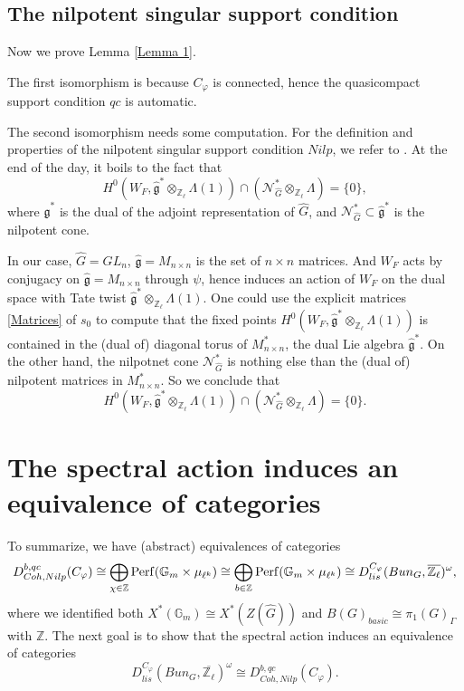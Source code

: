 \subsection{The nilpotent singular support condition}
Now we prove Lemma \ref{Lemma 1}. 

The first isomorphism is because $C_{\varphi}$ is connected, hence the quasicompact support condition $qc$ is automatic. 

The second isomorphism needs some computation. For the definition and properties of the nilpotent singular support condition $Nilp$, we refer to \cite[Section VIII.2]{fargues2021geometrization}. At the end of the day, it boils to the fact that
$$H^0(W_F, \hat{\mathfrak{g}}^*\otimes_{\mathbb{Z}_{\ell}}\Lambda(1)) \cap \left(\mathcal{N}_{\hat{G}}^*\otimes _{\mathbb{Z}_{\ell}}\Lambda\right)=\{0\},$$
where $\hat{\mathfrak{g}}^*$ is the dual of the adjoint representation of $\hat{G}$, and $\mathcal{N}_{\hat{G}}^* \subset \hat{\mathfrak{g}}^*$ is the nilpotent cone.

In our case, $\hat{G}=GL_n$, $\hat{\mathfrak{g}}=M_{n\times n}$ is the set of $n \times n$ matrices. And $W_F$ acts by conjugacy on $\hat{\mathfrak{g}}=M_{n\times n}$ through $\psi$, hence induces an action of $W_F$ on the dual space with Tate twist $\hat{\mathfrak{g}}^*\otimes_{\mathbb{Z}_{\ell}}\Lambda(1)$. One could use the explicit matrices \ref{Matrices} of $s_0$ to compute that the fixed points $H^0(W_F, \hat{\mathfrak{g}}^*\otimes_{\mathbb{Z}_{\ell}}\Lambda(1))$ is contained in the (dual of) diagonal torus of $M_{n\times n}^*$, the dual Lie algebra $\hat{\mathfrak{g}}^*$. On the other hand, the nilpotnet cone $\mathcal{N}_{\hat{G}}^*$ is nothing else than the (dual of) nilpotent matrices in $M_{n\times n}^*$. So we conclude that 
$$H^0(W_F, \hat{\mathfrak{g}}^*\otimes_{\mathbb{Z}_{\ell}}\Lambda(1)) \cap \left(\mathcal{N}_{\hat{G}}^*\otimes _{\mathbb{Z}_{\ell}}\Lambda\right)=\{0\}.$$


\section{The spectral action induces an equivalence of categories}
To summarize, we have (abstract) equivalences of categories
$$D^{b, qc}_{Coh, Nilp}(C_{\varphi}) \cong \bigoplus_{\chi \in \mathbb{Z}}\operatorname{\operatorname{Perf}}(\mathbb{G}_m \times \mu_{\ell^k}) \cong \bigoplus_{b \in \mathbb{Z}}\operatorname{\operatorname{Perf}}(\mathbb{G}_m \times \mu_{\ell^k}) \cong D^{C_{\varphi}}_{lis}(Bun_G, \overline{\mathbb{Z}_{\ell}})^{\omega},$$
where we identified both $X^*(\mathbb{G}_m) \cong X^*(Z(\hat{G}))$ and $B(G)_{basic} \cong \pi_1(G)_{\Gamma}$ with $\mathbb{Z}$. The next goal is to show that the spectral action induces an equivalence of categories
\begin{equation}\label{Equiv}
	D_{lis}^{C_{\varphi}}(Bun_G, \overline{\mathbb{Z}_{\ell}})^{\omega} \cong D^{b, qc}_{Coh, Nilp}(C_{\varphi}).
\end{equation}

